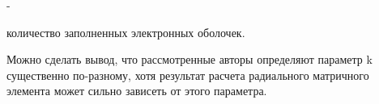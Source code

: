 \documentclass{article}
\begin{document}
 - 

\vspace{10pt}
{\large{}количество заполненных электронных оболочек.}

\vspace{10pt}
{\large{}Можно сделать вывод, что рассмотренные 
авторы определяют параметр k существенно по-разному, 
хотя результат расчета радиального матричного 
элемента может сильно зависеть от этого параметра.}

\newpage
\end{document}
